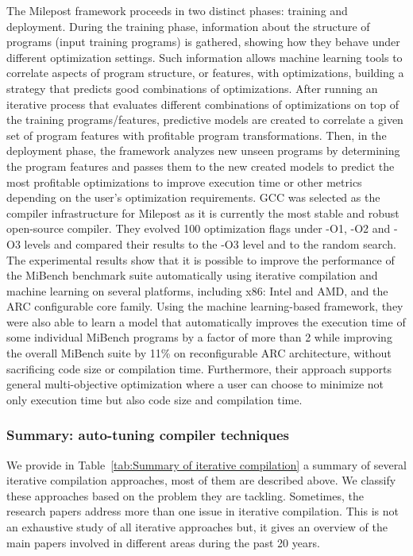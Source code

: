 The Milepost framework proceeds in two distinct phases: training and deployment. During the training phase, information about the structure of programs (input training programs) is gathered, showing how they behave under different optimization settings. Such information allows machine learning tools to correlate aspects of program structure, or features, with optimizations, building a strategy that predicts good combinations of optimizations. 
After running an iterative process that evaluates different combinations of optimizations on top of the training programs/features, predictive models are created to correlate a given set of program features with profitable program transformations. 
Then, in the deployment phase, the framework analyzes new unseen programs by determining the program features and passes them to the new created models to predict the most profitable optimizations to improve execution time or other metrics depending on the user’s optimization requirements.
GCC was selected as the compiler infrastructure for Milepost as it is currently the most stable and robust open-source compiler. They evolved 100 optimization flags under -O1, -O2 and -O3 levels and compared their results to the -O3 level and to the random search.
The experimental results show that it is possible to improve the performance of the MiBench benchmark suite automatically using iterative compilation and machine learning on several platforms, including x86: Intel and AMD, and the ARC configurable core family. Using the machine learning-based framework, they were also able to learn a model that automatically improves the execution time of some individual MiBench programs by a factor of more than 2 while improving the overall MiBench suite by 11\% on reconfigurable ARC architecture, without sacrificing code size or compilation time. Furthermore, their approach supports general multi-objective optimization where a user can choose to minimize not only execution time but also code size and compilation time.



\subsubsection{Summary: auto-tuning compiler techniques}
We provide in Table~\ref{tab:Summary of iterative compilation} a summary of several iterative compilation approaches, most of them are described above. We classify these approaches based on the problem they are tackling. Sometimes, the research papers address more than one issue in iterative compilation. This is not an exhaustive study of all iterative approaches but, it gives an overview of the main papers involved in different areas during the past 20 years.

